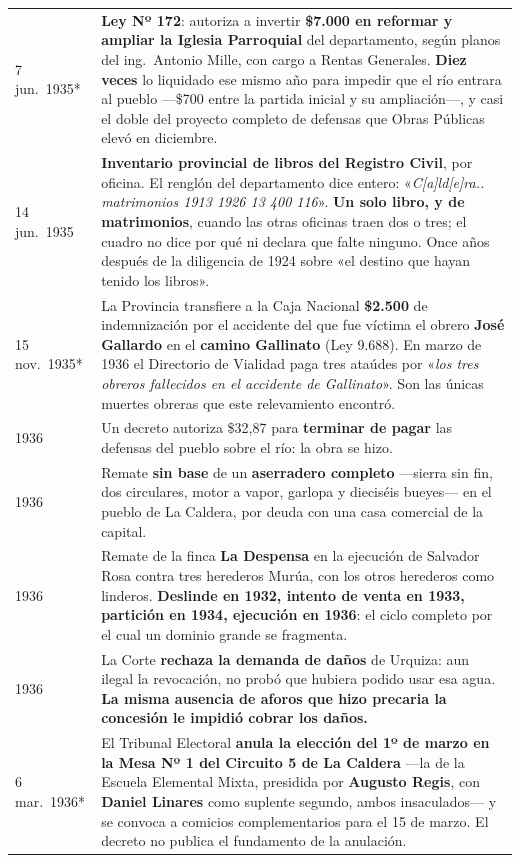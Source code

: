 \begin{longtable}{@{}p{2.7cm}p{10.3cm}@{}}
7 jun.\ 1935* & \textbf{Ley Nº 172}: autoriza a invertir \textbf{\$7.000 en reformar y ampliar la Iglesia Parroquial} del departamento, según planos del ing.\ Antonio Mille, con cargo a Rentas Generales. \textbf{Diez veces} lo liquidado ese mismo año para impedir que el río entrara al pueblo ---\$700 entre la partida inicial y su ampliación---, y casi el doble del proyecto completo de defensas que Obras Públicas elevó en diciembre. \\
14 jun.\ 1935 & \textbf{Inventario provincial de libros del Registro Civil}, por oficina. El renglón del departamento dice entero: «\textit{C[a]ld[e]ra.. matrimonios 1913 1926 13 400 116}». \textbf{Un solo libro, y de matrimonios}, cuando las otras oficinas traen dos o tres; el cuadro no dice por qué ni declara que falte ninguno. Once años después de la diligencia de 1924 sobre «el destino que hayan tenido los libros». \\
15 nov.\ 1935* & La Provincia transfiere a la Caja Nacional \textbf{\$2.500} de indemnización por el accidente del que fue víctima el obrero \textbf{José Gallardo} en el \textbf{camino Gallinato} (Ley 9.688). En marzo de 1936 el Directorio de Vialidad paga tres ataúdes por «\textit{los tres obreros fallecidos en el accidente de Gallinato}». Son las únicas muertes obreras que este relevamiento encontró. \\
1936 & Un decreto autoriza \$32,87 para \textbf{terminar de pagar} las defensas del pueblo sobre el río: la obra se hizo. \\
1936 & Remate \textbf{sin base} de un \textbf{aserradero completo} —sierra sin fin, dos circulares, motor a vapor, garlopa y dieciséis bueyes— en el pueblo de La Caldera, por deuda con una casa comercial de la capital. \\
1936 & Remate de la finca \textbf{La Despensa} en la ejecución de Salvador Rosa contra tres herederos Murúa, con los otros herederos como linderos. \textbf{Deslinde en 1932, intento de venta en 1933, partición en 1934, ejecución en 1936}: el ciclo completo por el cual un dominio grande se fragmenta. \\
1936 & La Corte \textbf{rechaza la demanda de daños} de Urquiza\index{Urquiza, Francisco S.}: aun ilegal la revocación, no probó que hubiera podido usar esa agua. \textbf{La misma ausencia de aforos que hizo precaria la concesión le impidió cobrar los daños.} \\
6 mar.\ 1936* & El Tribunal Electoral \textbf{anula la elección del 1º de marzo en la Mesa Nº 1 del Circuito 5 de La Caldera} ---la de la Escuela Elemental Mixta, presidida por \textbf{Augusto Regis}\index{Regis, Augusto}, con \textbf{Daniel Linares}\index{Linares, Daniel} como suplente segundo, ambos insaculados--- y se convoca a comicios complementarios para el 15 de marzo. El decreto no publica el fundamento de la anulación. \\

\end{longtable}
